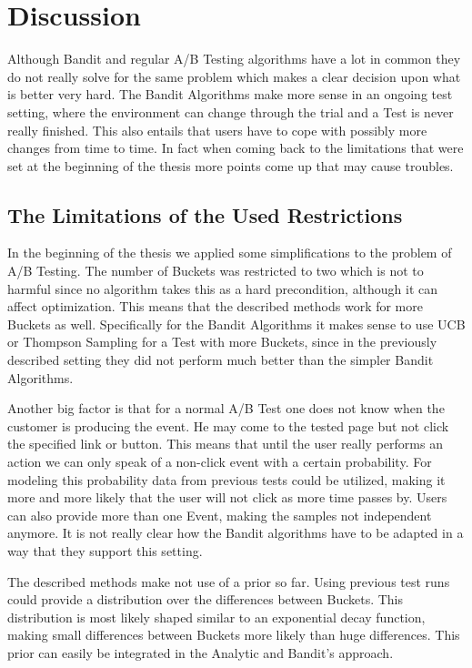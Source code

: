 \documentclass[main.tex]{subfiles}
\begin{document}
\chapter{Discussion}
Although Bandit and regular A/B Testing algorithms have a lot in common they do not really solve for the same problem which makes a clear decision upon what is better very hard. The Bandit Algorithms make more sense in an ongoing test setting, where the environment can change through the trial and a Test is never really finished. This also entails that users have to cope with possibly more changes from time to time. In fact when coming back to the limitations that were set at the beginning of the thesis more points come up that may cause troubles.

\section{The Limitations of the Used Restrictions}
In the beginning of the thesis we applied some simplifications to the problem of A/B Testing. The number of Buckets was restricted to two which is not to harmful since no algorithm takes this as a hard precondition, although it can affect optimization. This means that the described methods work for more Buckets as well. Specifically for the Bandit Algorithms it makes sense to use UCB or Thompson Sampling for a Test with more Buckets, since in the previously described setting they did not perform much better than the simpler Bandit Algorithms.

Another big factor is that for a normal A/B Test one does not know when the customer is producing the event. He may come to the tested page but not click the specified link or button. This means that until the user really performs an action we can only speak of a non-click event with a certain probability. For modeling this probability data from previous tests could be utilized, making it more and more likely that the user will not click as more time passes by. Users can also provide more than one Event, making the samples not independent anymore. It is not really clear how the Bandit algorithms have to be adapted in a way that they support this setting.

The described methods make not use of a prior so far. Using previous test runs could provide a distribution over the differences between Buckets. This distribution is most likely shaped similar to an exponential decay function, making small differences between Buckets more likely than huge differences. This prior can easily be integrated in the Analytic and Bandit's approach.
\end{document}
